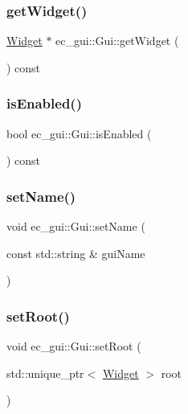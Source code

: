 \subsubsection{\texorpdfstring{get\+Widget()}{getWidget()}}
{\footnotesize\ttfamily \mbox{\hyperlink{classec__gui_1_1_widget}{Widget}} $\ast$ ec\+\_\+gui\+::\+Gui\+::get\+Widget (\begin{DoxyParamCaption}{ }\end{DoxyParamCaption}) const}

\mbox{\label{classec__gui_1_1_gui_a1afd78c6ec1dc802c58adf5eb73fbf2e}} 
\subsubsection{\texorpdfstring{is\+Enabled()}{isEnabled()}}
{\footnotesize\ttfamily bool ec\+\_\+gui\+::\+Gui\+::is\+Enabled (\begin{DoxyParamCaption}{ }\end{DoxyParamCaption}) const}

\mbox{\label{classec__gui_1_1_gui_a3d5ebcd1961f7f2b352ab071061e1c3f}} 
\subsubsection{\texorpdfstring{set\+Name()}{setName()}}
{\footnotesize\ttfamily void ec\+\_\+gui\+::\+Gui\+::set\+Name (\begin{DoxyParamCaption}\item[{const std\+::string \&}]{gui\+Name }\end{DoxyParamCaption})}

\mbox{\label{classec__gui_1_1_gui_a85e0f5a75c0721cd6d83fa0531ebaa4d}} 
\subsubsection{\texorpdfstring{set\+Root()}{setRoot()}}
{\footnotesize\ttfamily void ec\+\_\+gui\+::\+Gui\+::set\+Root (\begin{DoxyParamCaption}\item[{std\+::unique\+\_\+ptr$<$ \mbox{\hyperlink{classec__gui_1_1_widget}{Widget}} $>$}]{root }\end{DoxyParamCaption})}



